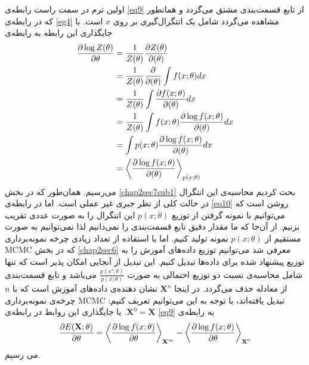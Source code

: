 اولین ترم در سمت راست رابطه‌‌ی
\ref{eq9}
از تابع قسمت‌بندی مشتق می‌گردد و همانطور که در رابطه‌ی
\ref{eg4}
مشاهده می‌‌گردد شامل یک انتگرال‌گیری بر روی
$x$
است. با جایگذاری این رابطه به رابطه‌ی
\begin{align}
	\centering
	\label{eq10}
	\dfrac{\partial\log Z(\theta)}{\partial \theta} &= \dfrac{1}{Z(\theta)}\dfrac{\partial Z(\theta)}{\partial(\theta)}\\ \nonumber
	&=\dfrac{1}{Z(\theta)}\dfrac{\partial}{\partial(\theta)}\int f(x;\theta)dx\\ \nonumber
	&=\dfrac{1}{Z(\theta)}\int \dfrac{\partial f(x;\theta)}{\partial(\theta)}dx\\	\nonumber
	&=\dfrac{1}{Z(\theta)}\int f(x;\theta) \dfrac{\partial \log f(x;\theta)}{\partial(\theta)}dx\\ \nonumber
	&= \int p(x;\theta) \dfrac{\partial \log f(x;\theta)}{\partial(\theta)}dx\\ \nonumber
	&= \left\langle \dfrac{\partial \log f(x;\theta)}{\partial(\theta)}\right\rangle_{p(x;\theta)}
\end{align}
می‌رسیم. همان‌طور که در بخش
\ref{chap2sec7sub1}
بحث کردیم محاسبه‌ی این انتگرال در حالت کلی‌ از نظر جبری غیر عملی‌ است. اما در رابطه‌ی
\ref{eq10}
روشن است که می‌‌توانیم با نمونه گرفتن از توزیع
$p(x;\theta)$
این انتگرال را به صورت عددی تقریب بزنیم.
از آن‌جا که ما مقدار دقیق تابع قسمت‌بندی را نمی‌‌دانیم لذا نمی‌‌توانیم به صورت مستقیم از
$p(x;\theta)$
نمونه تولید کنیم. اما با استفاده از تعداد زیادی چرخه نمونه‌برداری
MCMC
که در بخش
\ref{chap2sec6}
معرفی‌ شد می‌توانیم توزیع داده‌های آموزش  را به توزیع پیشنهاد شده برای داده‌ها تبدیل کنیم. این تبدیل از آنجایی امکان پذیر است که تنها شامل محاسبه‌ی نسبت دو توزیع احتمالی‌ به صورت
$\frac{p(x';\theta)}{p(x;\theta)}$
می‌باشد و تابع قسمت‌بندی از معادله حذف می‌‌گردد. در اینجا
$\textbf{X}^n$
نشان دهنده‌ی داده‌های آموزش است که با
$n$ 
چرخه‌ی نمونه‌برداری
MCMC
تبدیل یافته‌اند، با توجه به این می‌‌توانیم تعریف کنیم‌:
$\textbf{X}^0 = \textbf{X}$.
با جایگذاری این روابط در رابطه‌ی
\ref{eq9}
به رابطه‌ی
\begin{align}
	\centering
	\label{eq11}
	\dfrac{\partial E(\textbf{X};\theta)}{\partial \theta} = \left\langle \dfrac{\partial \log f(x; \theta)}{\partial \theta} \right\rangle_{\textbf{X}^{\infty}} - \left\langle \dfrac{\partial \log f(x;\theta)}{\partial \theta}\right\rangle_{\textbf{X}^0}
\end{align}
می‌ رسیم.

